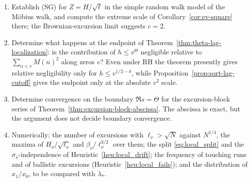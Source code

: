 \documentclass[11pt]{amsart}
\numberwithin{equation}{section}
\theoremstyle{plain}
\theoremstyle{definition}
\theoremstyle{remark}
\begin{document}
\begin{enumerate}[label=\textup{(\arabic*)}]
whether the bridge constraints \eqref{eq:Q_def}, \eqref{eq:zeroth-corr}
admit a third independent relation involving the defect
$\ell_\nu/2-H_\nu\ge0$.
\item Establish (SG) for $Z=H/\sqrt\ell$ in the simple random walk model of
the M\"obius walk, and compute the extreme scale of
Corollary~\ref{cor:ev-square} there; the Brownian-excursion limit suggests
$c=2$.
\item Determine what happens at the endpoint of
Theorem~\ref{thm:theta-lag-localization}: is the contribution of
$h\le v^\Theta$ negligible relative to
$\sum_{n<v}M(n)^2$ along zeros $v$?  Even under RH the theorem presently
gives relative negligibility only for $h\le v^{1/2-\delta}$, while
Proposition~\ref{prop:sqrt-lag-cutoff} gives the endpoint only at the
absolute $v^2$ scale.
\item Determine convergence on the boundary
$\Re s=\Theta$ for the excursion-block series of
Theorem~\ref{thm:excursion-block-abscissa}.  The abscissa is exact, but the
argument does not decide boundary convergence.
\item Numerically: the number of excursions with $\ell_\nu>\sqrt N$ against
$N^{1/4}$, the maxima of $H_\nu/\sqrt{\ell_\nu}$ and $\beta_\nu/\ell_\nu^{3/2}$
over them; the split \eqref{eq:local_split} and the $\sigma_\nu$-independence
of Heuristic~\ref{heu:local_drift}; the frequency of touching runs and of
ballistic excursions (Heuristic~\ref{heu:local_fails}); and the distribution
of $x_1/x_0$, to be compared with $\lambda_*$.
\end{enumerate}
\end{document}
